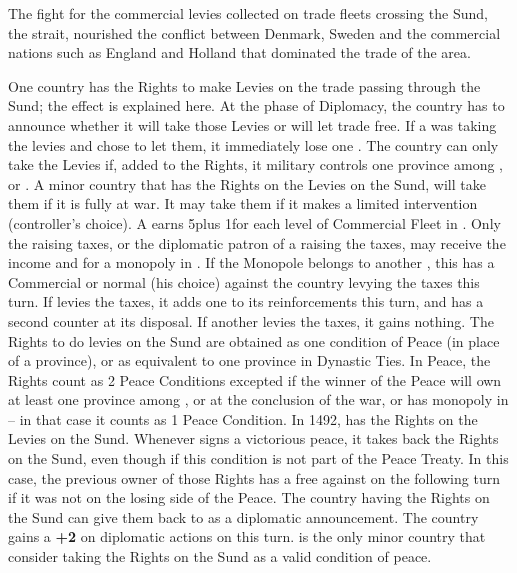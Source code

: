 \label{chSpecific:Sund Levies}
\begin{designnote}
  The fight for the commercial levies collected on trade fleets crossing the
  Sund, the  strait, nourished the conflict between Denmark,
  Sweden and the commercial nations such as England and Holland that dominated
  the trade of the area.
\end{designnote}
\aparag One country has the Rights to make Levies on the trade passing through
the Sund; the effect is explained here.
\bparag At the phase of Diplomacy, the country has to announce whether it will
take those Levies or will let trade free.
\bparag If a \MAJ was taking the levies and chose to let them, it immediately
lose one \STAB.
\bparag The country can only take the Levies if, added to the Rights, it
military controls one province among ,
 or .
\bparag A minor country that has the Rights on the Levies on the Sund, will
take them if it is fully at war. It may take them if it makes a limited
intervention (controller's choice).
\bparag A \MAJ earns 5\ducats plus 1\ducats for each level of Commercial Fleet
in .
\bparag Only the \MAJ raising taxes, or the diplomatic patron of a \MIN
raising the taxes, may receive the income and \PV for a monopoly in
. If the Monopole belongs to another \MAJ, this \MAJ has a
Commercial or normal \CB (his choice) against the country levying the taxes
this turn.
\bparag If  levies the taxes, it adds one \LD to its
reinforcements this turn, and has a second \ARMY counter at its disposal.
\bparag If another \MIN levies the taxes, it gains nothing.
\bparag The Rights to do levies on the Sund are obtained as one condition of
Peace (in place of a province), or as equivalent to one province in Dynastic
Ties.
\bparag In Peace, the Rights count as 2 Peace Conditions excepted if the
winner of the Peace will own at least one province among ,
 or  at the conclusion of the war,
or has monopoly in  -- in that case it counts as 1 Peace
Condition.
\bparag In 1492,  has the Rights on the Levies on the Sund.
\bparag Whenever  signs a victorious peace, it takes back the
Rights on the Sund, even though if this condition is not part of the Peace
Treaty. In this case, the previous owner of those Rights has a free \CB
against  on the following turn if it was not on the losing side
of the Peace.
\bparag The country having the Rights on the Sund can give them back to
 as a diplomatic announcement. The country gains a {\bf +2} on
diplomatic actions on  this turn.
\bparag {} is the only minor country that consider taking the
Rights on the Sund as a valid condition of peace.


